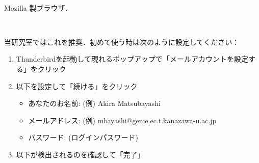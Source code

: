 \documentclass[main]{subfiles}
\begin{document}
\begin{description}
\begin{description}
    \end{description}

    \item[\textrm{Web} ブラウザ] 　

    
    \begin{description}

        \vspace{0.7em}

        \item[\textrm{Firefox}] Mozilla 製ブラウザ．
    
    \end{description}

    \item[メーラー] 　

    \begin{description}

        \vspace{0.7em}

        \item[\textrm{Thunderbird}] 当研究室ではこれを推奨．初めて使う時は次のように設定してください：

        \begin{enumerate}[itemsep=0.8em]
            
            \item Thunderbirdを起動して現れるポップアップで「メールアカウントを設定する」をクリック
            
            \item 以下を設定して「続ける」をクリック

                \begin{itemize}
                    
                    \item あなたのお名前: (例) Akira Matsubayashi

                    \item メールアドレス: (例) mbayashi@genie.ec.t.kanazawa-u.ac.jp

                    \item パスワード: (ログインパスワード)
                
                \end{itemize}

            \item 以下が検出されるのを確認して「完了」

                \begin{itemize}
                    

\end{itemize}
\end{enumerate}
\end{description}
\end{description}
\end{document}
